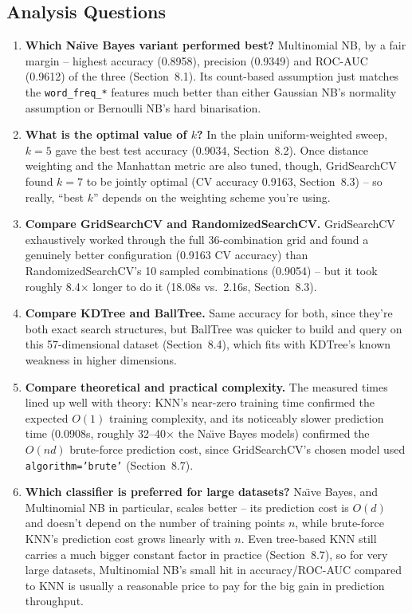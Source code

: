 \documentclass[12pt,a4paper]{article}
\begin{document}
\subsection*{Analysis Questions}
\begin{enumerate}[leftmargin=*]
\item \textbf{Which Na\"{\i}ve Bayes variant performed best?} Multinomial NB, by a fair margin -- highest accuracy (0.8958), precision (0.9349) and ROC-AUC (0.9612) of the three (Section~8.1). Its count-based assumption just matches the \texttt{word\_freq\_*} features much better than either Gaussian NB's normality assumption or Bernoulli NB's hard binarisation.
\item \textbf{What is the optimal value of $k$?} In the plain uniform-weighted sweep, $k=5$ gave the best test accuracy (0.9034, Section~8.2). Once distance weighting and the Manhattan metric are also tuned, though, GridSearchCV found $k=7$ to be jointly optimal (CV accuracy 0.9163, Section~8.3) -- so really, ``best $k$'' depends on the weighting scheme you're using.
\item \textbf{Compare GridSearchCV and RandomizedSearchCV.} GridSearchCV exhaustively worked through the full 36-combination grid and found a genuinely better configuration (0.9163 CV accuracy) than RandomizedSearchCV's 10 sampled combinations (0.9054) -- but it took roughly 8.4$\times$ longer to do it (18.08s vs.\ 2.16s, Section~8.3).
\item \textbf{Compare KDTree and BallTree.} Same accuracy for both, since they're both exact search structures, but BallTree was quicker to build and query on this 57-dimensional dataset (Section~8.4), which fits with KDTree's known weakness in higher dimensions.
\item \textbf{Compare theoretical and practical complexity.} The measured times lined up well with theory: KNN's near-zero training time confirmed the expected $O(1)$ training complexity, and its noticeably slower prediction time (0.0908s, roughly 32--40$\times$ the Na\"{\i}ve Bayes models) confirmed the $O(nd)$ brute-force prediction cost, since GridSearchCV's chosen model used \texttt{algorithm='brute'} (Section~8.7).
\item \textbf{Which classifier is preferred for large datasets?} Na\"{\i}ve Bayes, and Multinomial NB in particular, scales better -- its prediction cost is $O(d)$ and doesn't depend on the number of training points $n$, while brute-force KNN's prediction cost grows linearly with $n$. Even tree-based KNN still carries a much bigger constant factor in practice (Section~8.7), so for very large datasets, Multinomial NB's small hit in accuracy/ROC-AUC compared to KNN is usually a reasonable price to pay for the big gain in prediction throughput.
\end{enumerate}
 
\end{document}
